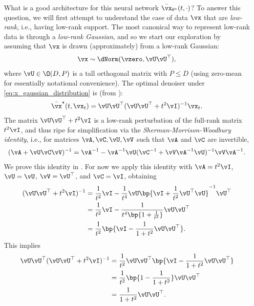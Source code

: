 \documentclass[../../book-main.tex]{subfiles}
\begin{document}
What is a good architecture for this neural network
\(\bar{\vx}_{\theta^{\star}}(t, \cdot)\)? To answer this question, we
will first attempt to understand the case of data \(\vx\) that are
\textit{low-rank}, i.e., having low-rank support. The most canonical
way to represent low-rank data is through a \textit{low-rank
Gaussian}, and so we start our exploration by assuming that \(\vx\)
is drawn (approximately) from a low-rank Gaussian:
\begin{equation}\label{eq:x_gaussian_distribution}
    \vx \sim \dNorm(\vzero, \vU\vU^{\top}),
\end{equation}
where \(\vU \in \O(D, P)\) is a tall orthogonal matrix with \(P \leq
D\) (using zero-mean for essentially notational convenience).  The
optimal denoiser under \eqref{eq:x_gaussian_distribution} is (from
):
\begin{equation}\label{eq:optimal denoiser}
    \bar{\vx}^{\star}(t, \vx_{t}) = \vU\vU^{\top}(\vU\vU^{\top} +
    t^{2}\vI)^{-1}\vx_{t}.
\end{equation}
The matrix  \(\vU\vU^{\top} + t^{2}\vI\) is a low-rank perturbation
of the full-rank matrix \(t^{2}\vI\), and thus ripe for
simplification via the \textit{Sherman-Morrison-Woodbury identity},
i.e., for matrices \(\vA, \vC, \vU, \vV\) such that \(\vA\) and
\(\vC\) are invertible,
\begin{equation}\label{eq:sherman_morrison_woodbury}
    (\vA + \vU\vC\vV)^{-1} = \vA^{-1} - \vA^{-1}\vU(\vC^{-1} +
    \vV\vA^{-1}\vU)^{-1}\vV\vA^{-1}.
\end{equation}
We prove this identity in
. For now we apply
this identity with \(\vA = t^{2}\vI\), \(\vU = \vU\), \(\vV =
\vU^{\top}\), and \(\vC = \vI\), obtaining
\begin{align}
    (\vU\vU^{\top} + t^{2}\vI)^{-1}
    &= \frac{1}{t^{2}}\vI - \frac{1}{t^{4}}\vU\bp{\vI +
    \frac{1}{t^{2}}\vU^{\top}\vU}^{-1}\vU^{\top} \\
    &= \frac{1}{t^{2}}\vI - \frac{1}{t^{4}\bp{1 +
    \frac{1}{t^{2}}}}\vU\vU^{\top} \\
    &= \frac{1}{t^{2}}\bp{\vI - \frac{1}{1 +
    t^{2}}\vU\vU^{\top}}.\label{eq:gaussian_lowrank_inverse_perturbation_simplified}
\end{align}
This implies
\begin{align}
    \vU\vU^{\top}(\vU\vU^{\top} + t^{2}\vI)^{-1}
    &= \frac{1}{t^{2}}\vU\vU^{\top}\bp{\vI - \frac{1}{1 +
    t^{2}}\vU\vU^{\top}} \\
    &= \frac{1}{t^{2}}\bp{1 - \frac{1}{1 + t^{2}}}\vU\vU^{\top} \\
    &= \frac{1}{1 +
    t^{2}}\vU\vU^{\top}.\label{eq:gaussian_lowrank_denoiser_simplified}
\end{align}
\end{document}
